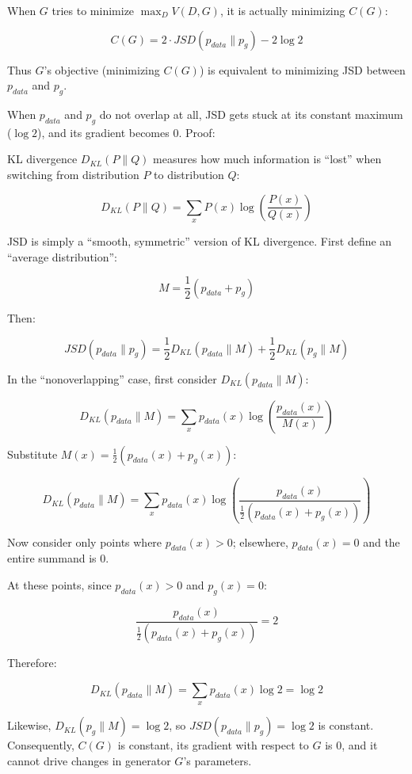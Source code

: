 When \(G\) tries to minimize \(\max_D V(D,G)\), it is actually minimizing \(C(G)\):

\[
C(G)=2\cdot JSD(p_{data}\parallel p_g)-2\log 2
\]

Thus \(G\)'s objective (minimizing \(C(G)\)) is equivalent to minimizing JSD between \(p_{data}\) and \(p_g\).

When \(p_{data}\) and \(p_g\) do not overlap at all, JSD gets stuck at its constant maximum (\(\log 2\)), and its gradient becomes \(0\). Proof:

KL divergence \(D_{KL}(P\parallel Q)\) measures how much information is ``lost'' when switching from distribution \(P\) to distribution \(Q\):

\[
D_{KL}(P\parallel Q)=\sum_x P(x)\log\left(\frac{P(x)}{Q(x)}\right)
\]

JSD is simply a ``smooth, symmetric'' version of KL divergence. First define an ``average distribution'':

\[
M=\frac{1}{2}(p_{data}+p_g)
\]

Then:

\[
JSD(p_{data}\parallel p_g)=\frac{1}{2}D_{KL}(p_{data}\parallel M)+\frac{1}{2}D_{KL}(p_g\parallel M)
\]

In the ``nonoverlapping'' case, first consider \(D_{KL}(p_{data}\parallel M)\):

\[
D_{KL}(p_{data}\parallel M)=\sum_x p_{data}(x)\log\left(\frac{p_{data}(x)}{M(x)}\right)
\]

Substitute \(M(x)=\frac{1}{2}(p_{data}(x)+p_g(x))\):

\[
D_{KL}(p_{data}\parallel M)=\sum_x p_{data}(x)\log\left(\frac{p_{data}(x)}{\frac{1}{2}(p_{data}(x)+p_g(x))}\right)
\]

Now consider only points where \(p_{data}(x)>0\); elsewhere, \(p_{data}(x)=0\) and the entire summand is 0.

At these points, since \(p_{data}(x)>0\) and \(p_g(x)=0\):

\[
\frac{p_{data}(x)}{\frac{1}{2}(p_{data}(x)+p_g(x))}=2
\]

Therefore:

\[
D_{KL}(p_{data}\parallel M)=\sum_x p_{data}(x)\log 2=\log 2
\]

Likewise, \(D_{KL}(p_g\parallel M)=\log 2\), so \(JSD(p_{data}\parallel p_g)=\log 2\) is constant. Consequently, \(C(G)\) is constant, its gradient with respect to \(G\) is 0, and it cannot drive changes in generator \(G\)'s parameters.


